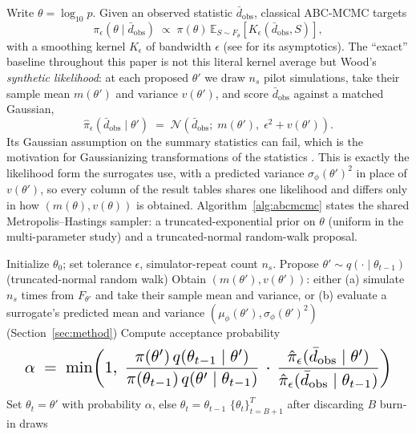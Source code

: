 \documentclass[sn-basic,iicol,pdflatex]{sn-jnl}
\newcommand{\dbar}{\ensuremath{\bar d}}
\begin{document}
Write $\theta = \log_{10} p$. Given an observed statistic $\dbar_{\mathrm{obs}}$,
classical ABC-MCMC \citep{marjoram2003} targets
\[
\pi_\epsilon(\theta \mid \dbar_{\mathrm{obs}}) \;\propto\; \pi(\theta)\,
\mathbb{E}_{S \sim F_\theta}\!\left[K_\epsilon\!\left(\dbar_{\mathrm{obs}}, S\right)\right],
\]
with a smoothing kernel $K_\epsilon$ of bandwidth $\epsilon$ (see \citealp{frazier2018} for its asymptotics). The ``exact''
baseline throughout this paper is not this literal kernel average but Wood's
\citep{wood2010,price2018} \emph{synthetic likelihood}: at each proposed $\theta'$ we draw
$n_s$ pilot simulations, take their sample mean $m(\theta')$ and variance
$v(\theta')$, and score $\dbar_{\mathrm{obs}}$ against a matched Gaussian,
\[
\hat\pi_\epsilon(\dbar_{\mathrm{obs}} \mid \theta') \;=\;
\mathcal{N}\!\left(\dbar_{\mathrm{obs}};\; m(\theta'),\; \epsilon^2 + v(\theta')\right).
\]
Its Gaussian assumption on the summary statistics can fail, which is the motivation for Gaussianizing transformations of the statistics \citep{nguyen2025}. This is exactly the likelihood form the surrogates use, with a predicted
variance $\sigma_\phi(\theta')^2$ in place of $v(\theta')$, so every column of
the result tables shares one likelihood and differs only in how
$(m(\theta), v(\theta))$ is obtained. Algorithm~\ref{alg:abcmcmc} states the
shared Metropolis--Hastings sampler: a truncated-exponential prior on $\theta$
(uniform in the multi-parameter study) and a truncated-normal random-walk
proposal.

\begin{algorithm}[H]
\caption{ABC-MCMC (Metropolis--Hastings, synthetic likelihood)}
\label{alg:abcmcmc}
\begin{algorithmic}[1]
\State Initialize $\theta_0$; set tolerance $\epsilon$, simulator-repeat count $n_s$.
  \State Propose $\theta' \sim q(\cdot \mid \theta_{t-1})$ (truncated-normal random walk)
  \State Obtain $(m(\theta'), v(\theta'))$: either (a) simulate $n_s$ times from $F_{\theta'}$ and take their sample mean and variance, or (b) evaluate a surrogate's predicted mean and variance $(\mu_\phi(\theta'), \sigma_\phi(\theta')^2)$ (Section~\ref{sec:method})
  \State Compute acceptance probability
  \[
  \resizebox{0.95\linewidth}{!}{$\displaystyle\alpha \;=\; \min\!\left(1,\; \frac{\pi(\theta')\,q(\theta_{t-1}\mid\theta')}{\pi(\theta_{t-1})\,q(\theta'\mid\theta_{t-1})}\,\cdot\,\frac{\hat\pi_\epsilon(\dbar_{\mathrm{obs}} \mid \theta')}{\hat\pi_\epsilon(\dbar_{\mathrm{obs}} \mid \theta_{t-1})}\right)$}
  \]
  \State Set $\theta_t = \theta'$ with probability $\alpha$, else $\theta_t = \theta_{t-1}$
\EndFor
\State \Return $\{\theta_t\}_{t=B+1}^{T}$ after discarding $B$ burn-in draws
\end{algorithmic}
\end{algorithm}
\end{document}
